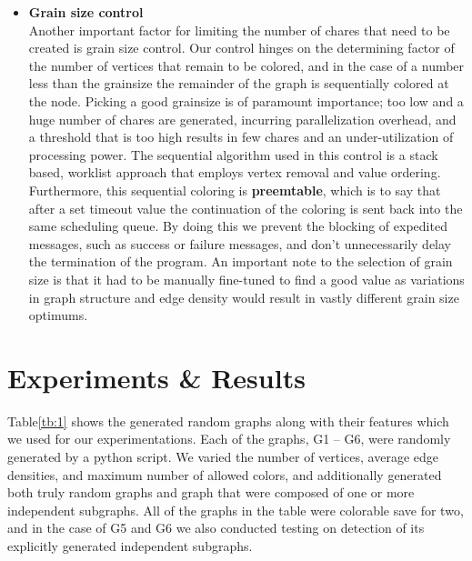 \documentclass[10pt,twoside]{article}
\begin{document}
\begin{itemize}
  \item \textbf{Grain size control}\\ 
  Another important factor for limiting the number of chares that need to be
  created is grain size control. Our control hinges on the determining factor
  of the number of vertices that remain to be colored, and in the case of a
  number less than the grainsize the remainder of the graph is sequentially
  colored at the node. Picking a good grainsize is of paramount importance; too
  low and a huge number of chares are generated, incurring parallelization
  overhead, and a threshold that is too high results in few chares and an
  under-utilization of processing power. 
  The sequential algorithm used in this control is a stack based, worklist
  approach that employs vertex removal and value ordering. Furthermore, this
  sequential coloring is \textbf{preemtable}, which is to say that after a set timeout
  value the continuation of the coloring is sent back into the same scheduling
  queue. By doing this we prevent the blocking of expedited messages, such as
  success or failure messages, and don’t unnecessarily delay the termination of
  the program. An important note to the selection of grain size is that it had
  to be manually fine-tuned to find a good value as variations in graph
  structure and edge density would result in vastly different grain size
  optimums.
\end{itemize}  
            

\section{Experiments \& Results}

  Table\ref{tb:1} shows the generated random graphs along with their features which
  we used for our experimentations. 
  Each of the graphs, G1 – G6, were randomly generated by a python script. We
  varied the number of vertices, average edge densities, and maximum number of
  allowed colors, and additionally generated both truly random graphs and graph
  that were composed of one or more independent subgraphs. All of the graphs in
  the table were colorable save for two, and in the case of G5 and G6 we also
  conducted testing on detection of its explicitly generated independent
  subgraphs. 
\end{document}
